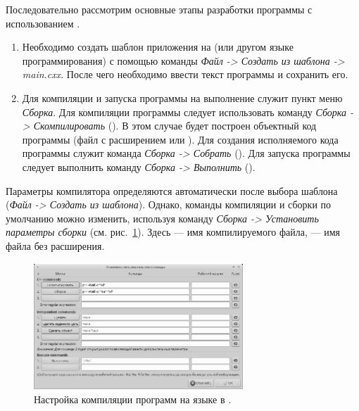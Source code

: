 Последовательно рассмотрим основные этапы разработки программы с использованием . 
\begin{enumerate}
\item Необходимо создать шаблон приложения на  (или другом языке программирования) с помощью 
команды \emph{Файл -> Создать из шаблона -> main.cxx}. После чего необходимо ввести текст 
программы и сохранить его. 
\item Для компиляции и запуска программы на выполнение служит пункт меню \emph{Сборка}. Для компиляции программы следует
использовать команду \emph{Сборка -> Скомпилировать} (). В этом случае будет построен объектный код программы (файл с расширением
 или ). Для создания исполняемого кода программы служит команда \emph{Сборка -> Собрать} ().  Для
запуска программы следует выполнить команду \emph{Сборка -> Выполнить} ().
\end{enumerate}

Параметры компилятора определяются автоматически после выбора шаблона (\emph{Файл -> Создать из шаблона}).
Однако, команды компиляции и сборки по умолчанию можно изменить, используя команду \emph{Сборка -> Установить
параметры сборки} (см. рис.~\ref{app:refDrawing6}). Здесь  --- имя компилируемого файла, 
 --- имя файла без расширения.

\begin{figure}[htb]
\begin{center}
\includegraphics[width=0.7\textwidth]{img/ris_app_7}
\caption[Настройка компиляции программ на языке  в .]{Настройка компиляции программ на языке  в
.}
\label{app:refDrawing6}
\end{center}
\end{figure}

